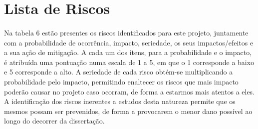 \section{Lista de Riscos}
\paragraph{}
Na tabela 6 estão presentes os riscos identificados para este projeto, juntamente com a probabilidade de ocorrência, impacto, seriedade, os seus impactos/efeitos e a sua ação de mitigação. A cada um dos itens, para a probabilidade e o impacto, é atribuída uma pontuação numa escala de 1 a 5, em que o 1 corresponde a baixo e 5 corresponde a alto. A seriedade de cada risco obtém-se multiplicando a probabilidade pelo impacto, permitindo enaltecer os riscos que mais impacto poderão causar no projeto caso ocorram, de forma a estarmos mais atentos a eles. A identificação dos riscos inerentes a estudos desta natureza permite que os mesmos possam ser prevenidos, de forma a provocarem o menor dano possível ao longo do decorrer da dissertação.

